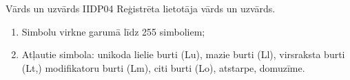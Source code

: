 {Vārds un uzvārds}
{IIDP04}
{
	Reģistrēta lietotāja vārds un uzvārds.
}
{
	\begin{enumerate}
		\item Simbolu virkne garumā līdz 255 simboliem;
		\item Atļautie simbola: unikoda lielie burti (Lu), mazie burti (Ll), virsraksta burti (Lt,) modifikatoru burti (Lm), citi burti (Lo), atstarpe, domuzīme.
	\end{enumerate}
}
{
}
